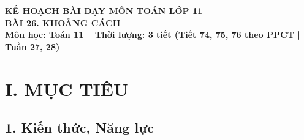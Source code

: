 \documentclass[12pt, a4paper]{article}
\begin{document}
\begin{center}
    {\fontsize{14pt}{17pt}\selectfont \textbf{KẾ HOẠCH BÀI DẠY MÔN TOÁN LỚP 11}}\\[6pt]
    {\fontsize{16pt}{19pt}\selectfont \textbf{BÀI 26. KHOẢNG CÁCH}}\\[4pt]
    {\fontsize{12pt}{15pt}\selectfont \textbf{Môn học: Toán 11} \ \textbar \ \textbf{Thời lượng: 3 tiết (Tiết 74, 75, 76 theo PPCT | Tuần 27, 28)}}
\end{center}

\vspace{5pt}

\section*{I. MỤC TIÊU}

\subsection*{1. Kiến thức, Năng lực}
\end{document}
